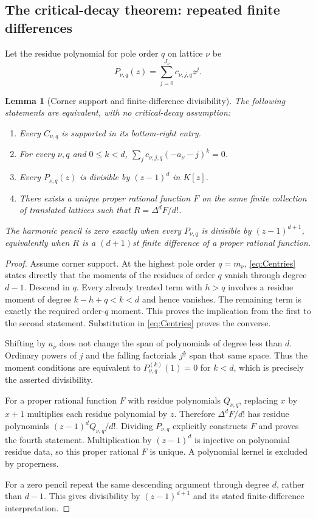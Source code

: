 \documentclass[11pt,letterpaper]{article}
\numberwithin{equation}{section}
\newtheorem{lemma}[theorem]{Lemma}
\theoremstyle{definition}\newtheorem{definition}[theorem]{Definition}
\theoremstyle{remark}\newtheorem{remark}[theorem]{Remark}
\newcommand{\fall}[2]{#1^{\underline{#2}}}
\begin{document}
\subsection{The critical-decay theorem: repeated finite differences}
Let the residue polynomial for pole order $q$ on lattice $\nu$ be
\begin{equation}\label{eq:Pq}
 P_{\nu,q}(z)=\sum_{j=0}^{J_\nu}c_{\nu,j,q}z^j.
\end{equation}

\begin{lemma}[Corner support and finite-difference divisibility]
\label{lem:corner-divisibility}
The following statements are equivalent, with no critical-decay assumption:
\begin{enumerate}
\item Every $C_{\nu,q}$ is supported in its bottom-right entry.
\item For every $\nu,q$ and $0\le k<d$,
      $\sum_jc_{\nu,j,q}(-a_\nu-j)^k=0$.
\item Every $P_{\nu,q}(z)$ is divisible by $(z-1)^d$ in $K[z]$.
\item There exists a unique proper rational function $F$ on the same
      finite collection of translated lattices such that
      $R=\Delta^dF/d!$.
\end{enumerate}
The harmonic pencil is zero exactly when every $P_{\nu,q}$ is
divisible by $(z-1)^{d+1}$, equivalently when $R$ is a
$(d+1)$st finite difference of a proper rational function.
\end{lemma}
\begin{proof}
Assume corner support. At the highest pole order $q=m_\nu$,
\eqref{eq:Centries} states directly that the moments of the residues
of order $q$ vanish through degree $d-1$. Descend in $q$.
Every already treated term with $h>q$ involves a residue moment of
degree $k-h+q<k<d$ and hence vanishes. The remaining term is exactly
the required order-$q$ moment. This proves the implication from the
first to the second statement. Substitution in \eqref{eq:Centries}
proves the converse.

Shifting by $a_\nu$ does not change the span of polynomials of degree
less than $d$. Ordinary powers of $j$ and the falling factorials
$\fall{j}{k}$ span that same space. Thus the moment conditions are
equivalent to $P_{\nu,q}^{(k)}(1)=0$ for $k<d$, which is precisely
the asserted divisibility.

For a proper rational function $F$ with residue polynomials
$Q_{\nu,q}$, replacing $x$ by $x+1$ multiplies each residue polynomial
by $z$. Therefore $\Delta^dF/d!$ has residue polynomials
$(z-1)^dQ_{\nu,q}/d!$. Dividing $P_{\nu,q}$ explicitly constructs
$F$ and proves the fourth statement. Multiplication by $(z-1)^d$
is injective on polynomial residue data, so this proper rational $F$
is unique. A polynomial kernel is excluded by properness.

For a zero pencil repeat the same descending argument through degree
$d$, rather than $d-1$. This gives divisibility by $(z-1)^{d+1}$
and its stated finite-difference interpretation.
\end{proof}
\end{document}
